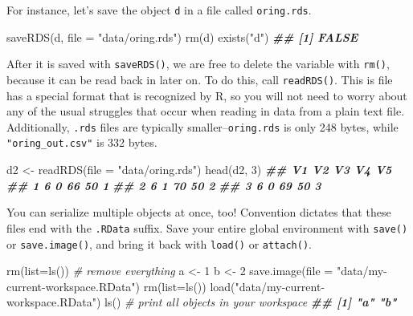 \documentclass[
  12pt,
  krantz2]{krantz}
\makeatletter
\newenvironment{Shaded}{\begin{snugshade}}{\end{snugshade}}
\newcommand{\AttributeTok}[1]{\textcolor[rgb]{0.61,0.61,0.61}{#1}}
\newcommand{\CommentTok}[1]{\textcolor[rgb]{0.37,0.37,0.37}{\textit{#1}}}
\newcommand{\DecValTok}[1]{\textcolor[rgb]{0.06,0.06,0.06}{#1}}
\newcommand{\DocumentationTok}[1]{\textcolor[rgb]{0.37,0.37,0.37}{\textbf{\textit{#1}}}}
\newcommand{\FunctionTok}[1]{\textcolor[rgb]{0,0,0}{#1}}
\newcommand{\NormalTok}[1]{#1}
\newcommand{\OtherTok}[1]{\textcolor[rgb]{0.37,0.37,0.37}{#1}}
\newcommand{\StringTok}[1]{\textcolor[rgb]{0.5,0.5,0.5}{#1}}
\newenvironment{kframe}{%
\medskip{}
\setlength{\fboxsep}{.8em}
 \def\at@end@of@kframe{}%
 \ifinner\ifhmode%
  \def\at@end@of@kframe{\end{minipage}}%
  \begin{minipage}{\columnwidth}%
 \fi\fi%
 \def\FrameCommand##1{\hskip\@totalleftmargin \hskip-\fboxsep
 \colorbox{shadecolor}{##1}\hskip-\fboxsep
     \hskip-\linewidth \hskip-\@totalleftmargin \hskip\columnwidth}%
 \MakeFramed {\advance\hsize-\width
   \@totalleftmargin\z@ \linewidth\hsize
   \@setminipage}}%
 {\par\unskip\endMakeFramed%
 \at@end@of@kframe}
\renewenvironment{Shaded}{\begin{kframe}}{\end{kframe}}
\makeatother
\begin{document}
For instance, let's save the object \texttt{d} in a file called \texttt{oring.rds}.

\begin{Shaded}
\begin{Highlighting}[]
\FunctionTok{saveRDS}\NormalTok{(d, }\AttributeTok{file =} \StringTok{"data/oring.rds"}\NormalTok{)}
\FunctionTok{rm}\NormalTok{(d)}
\FunctionTok{exists}\NormalTok{(}\StringTok{"d"}\NormalTok{)}
\DocumentationTok{\#\# [1] FALSE}
\end{Highlighting}
\end{Shaded}

After it is saved with \texttt{saveRDS()}, we are free to delete the variable with \texttt{rm()}, because it can be read back in later on. To do this, call \texttt{readRDS()}. This is file has a special format that is recognized by R, so you will not need to worry about any of the usual struggles that occur when reading in data from a plain text file. Additionally, \texttt{.rds} files are typically smaller--\texttt{oring.rds} is only 248 bytes, while \texttt{"oring\_out.csv"} is 332 bytes.

\begin{Shaded}
\begin{Highlighting}[]
\NormalTok{d2 }\OtherTok{\textless{}{-}} \FunctionTok{readRDS}\NormalTok{(}\AttributeTok{file =} \StringTok{"data/oring.rds"}\NormalTok{)}
\FunctionTok{head}\NormalTok{(d2, }\DecValTok{3}\NormalTok{)}
\DocumentationTok{\#\#   V1 V2 V3 V4 V5}
\DocumentationTok{\#\# 1  6  0 66 50  1}
\DocumentationTok{\#\# 2  6  1 70 50  2}
\DocumentationTok{\#\# 3  6  0 69 50  3}
\end{Highlighting}
\end{Shaded}

You can serialize multiple objects at once, too! Convention dictates that these files end with the \texttt{.RData} suffix. Save your entire global environment with \texttt{save()} or \texttt{save.image()}, and bring it back with \texttt{load()} or \texttt{attach()}.

\begin{Shaded}
\begin{Highlighting}[]
\FunctionTok{rm}\NormalTok{(}\AttributeTok{list=}\FunctionTok{ls}\NormalTok{()) }\CommentTok{\# remove everything}
\NormalTok{a }\OtherTok{\textless{}{-}} \DecValTok{1}
\NormalTok{b }\OtherTok{\textless{}{-}} \DecValTok{2}
\FunctionTok{save.image}\NormalTok{(}\AttributeTok{file =} \StringTok{"data/my{-}current{-}workspace.RData"}\NormalTok{)}
\FunctionTok{rm}\NormalTok{(}\AttributeTok{list=}\FunctionTok{ls}\NormalTok{()) }
\FunctionTok{load}\NormalTok{(}\StringTok{"data/my{-}current{-}workspace.RData"}\NormalTok{)}
\FunctionTok{ls}\NormalTok{() }\CommentTok{\# print all objects in your workspace}
\DocumentationTok{\#\# [1] "a" "b"}
\end{Highlighting}
\end{Shaded}
\end{document}
